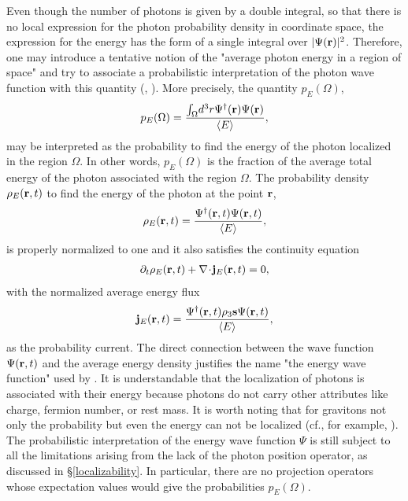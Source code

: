 \documentclass{article}
\begin{document}
Even though the number of photons is given by a double integral, so that
there is no local expression for the photon probability density in
coordinate space, the expression for the energy has the form of a single
integral over $\vert\Psi({\bf r})\vert^2$. Therefore, one may introduce a
tentative notion of the "average photon energy in a region of space" and try
to associate a probabilistic interpretation of the photon wave function with
this quantity (\cite{IBB_94}, \cite{Sipe_95}). More precisely, the quantity
$p_E(\Omega)$,
\begin{eqnarray}
 p_E(\Omega)
 = \frac{\int_{\Omega}\!d^3r\Psi^{\dagger}({\bf r})\Psi({\bf r})}
 {\langle E\rangle},
\end{eqnarray}
may be interpreted as the probability to find the energy of the photon
localized in the region $\Omega$. In other words, $p_E(\Omega)$ is the
fraction of the average total energy of the photon associated with the
region $\Omega$. The probability density $\rho_E({\bf r},t)$ to find the
energy of the photon at the point ${\bf r}$,
\begin{eqnarray}
 \rho_E({\bf r},t)
 = \frac{\Psi^{\dagger}({\bf r}, t)\Psi({\bf r}, t)}{\langle E\rangle},
\end{eqnarray}
is properly normalized to one and it also satisfies the continuity equation
\begin{eqnarray}
 \partial_t\rho_E({\bf r},t) + {\bf\nabla}\!\cdot\!{\bf j}_E({\bf r},t) = 0,
\end{eqnarray}
with the normalized average energy flux
\begin{eqnarray}
 {\bf j}_E({\bf r},t)
 = \frac{\Psi^{\dagger}({\bf r}, t)\rho_3{\bf s}\Psi({\bf r}, t)}
 {\langle E\rangle},
\end{eqnarray}
as the probability current. The direct connection between the wave function
$\Psi({\bf r},t)$ and the average energy density justifies the name "the
energy wave function" used by \cite{MW_95}. It is understandable that the
localization of photons is associated with their energy because photons do
not carry other attributes like charge, fermion number, or rest mass. It is
worth noting that for gravitons not only the probability but even the energy
can not be localized (cf., for example, \cite{WW_80}). The probabilistic
interpretation of the energy wave function $\Psi$ is still subject to all
the limitations arising from the lack of the photon position operator, as
discussed in \S \ref{localizability}. In particular, there are no projection
operators whose expectation values would give the probabilities
$p_E(\Omega)$.
\end{document}
